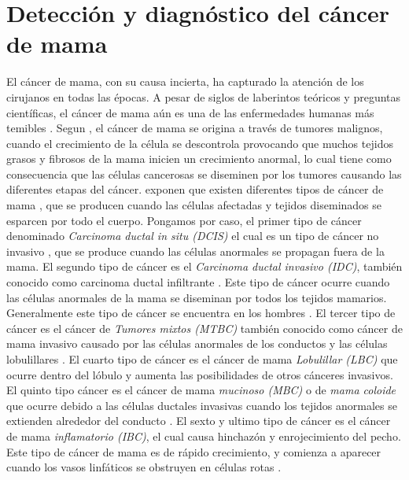 \section{Detección y diagnóstico del cáncer de mama}

El cáncer de mama, con su causa incierta, ha capturado la atención de los cirujanos en todas las épocas. A pesar de siglos de laberintos teóricos y preguntas científicas, el cáncer de mama aún es una de las enfermedades humanas más temibles \citep{Bland2009}. Segun \citep{Fatima2020}, el cáncer de mama se origina a través de tumores malignos, cuando el crecimiento de la célula se descontrola provocando que muchos tejidos grasos y fibrosos de la mama inicien un crecimiento anormal, lo cual tiene como consecuencia que las células cancerosas se diseminen por los tumores causando las diferentes etapas del cáncer. \citep{Fatima2020} exponen que existen diferentes tipos de cáncer de mama \citep{Sun2017}, que se producen cuando las células afectadas y tejidos diseminados se esparcen por todo el cuerpo. Pongamos por caso, el primer tipo de cáncer denominado \textit{Carcinoma ductal in situ (DCIS)} el cual es un tipo de cáncer no invasivo \citep{Hou2020}, que se produce cuando las células anormales se propagan fuera de la mama. El segundo tipo de cáncer es el \textit{Carcinoma ductal invasivo (IDC)}, también conocido como carcinoma ductal infiltrante \citep{Chaudhury2011}. Este tipo de cáncer ocurre cuando las células anormales de la mama se diseminan por todos los tejidos mamarios. Generalmente este tipo de cáncer se encuentra en los hombres \citep{Page1982}. El tercer tipo de cáncer es el cáncer de \textit{Tumores mixtos (MTBC)} también conocido como cáncer de mama invasivo \citep{Tuck1997} causado por las células anormales de los conductos y las células lobulillares \citep{Lee2017}. El cuarto tipo de cáncer es el cáncer de mama \textit{Lobulillar (LBC)} \citep{Masciari2007} que ocurre dentro del lóbulo y aumenta las posibilidades de otros cánceres invasivos. El quinto tipo cáncer es el cáncer de mama \textit{mucinoso (MBC)} o de \textit{mama coloide} \citep{Memis2000} que ocurre debido a las células ductales invasivas cuando los tejidos anormales se extienden alrededor del conducto \citep{Gradilone2011}. El sexto y ultimo tipo de cáncer es el cáncer de mama \textit{inflamatorio (IBC)}, el cual causa hinchazón y enrojecimiento del pecho. Este tipo de cáncer de mama es de rápido crecimiento, y comienza a aparecer cuando los vasos linfáticos se obstruyen en células rotas \citep{Robertson2010}.

